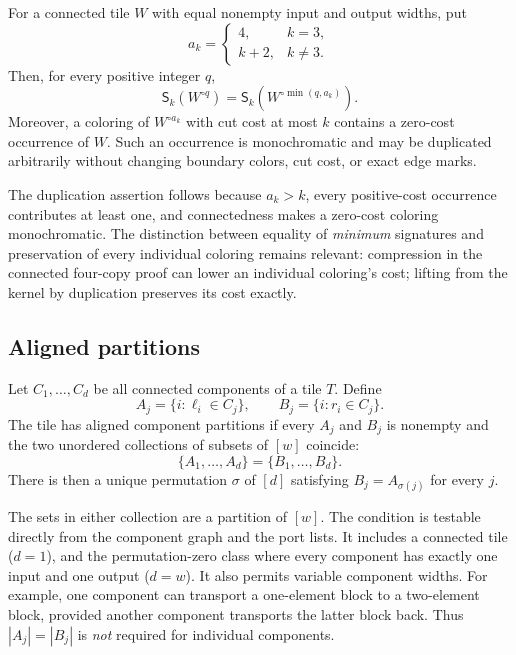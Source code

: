 \begin{lemma}
\label{lem:route-connected}
For a connected tile $W$ with equal nonempty input and output widths, put
\[
 a_k=\begin{cases}4,&k=3,\\ k+2,&k\ne3.\end{cases}
\]
Then, for every positive integer $q$,
\[
 \mathsf S_k(W^{\circ q})
 =\mathsf S_k(W^{\circ\min(q,a_k)}).
\]
Moreover, a coloring of $W^{\circ a_k}$ with cut cost at most $k$ contains a
zero-cost occurrence of $W$.  Such an occurrence is monochromatic and may be
duplicated arbitrarily without changing boundary colors, cut cost, or exact
edge marks.
\end{lemma}

The duplication assertion follows because $a_k>k$, every positive-cost
occurrence contributes at least one, and connectedness makes a zero-cost
coloring monochromatic.  The distinction between equality of \emph{minimum}
signatures and preservation of every individual coloring remains relevant:
compression in the connected four-copy proof can lower an individual coloring's
cost; lifting from the kernel by duplication preserves its cost exactly.

\subsection{Aligned partitions}

\begin{definition}
\label{def:route-aligned}
Let $C_1,\ldots,C_d$ be all connected components of a tile $T$.  Define
\[
 A_j=\{i:\ell_i\in C_j\},\qquad B_j=\{i:r_i\in C_j\}.
\]
The tile has aligned component partitions if every $A_j$ and $B_j$ is nonempty
and the two unordered collections of subsets of $[w]$ coincide:
\[
 \{A_1,\ldots,A_d\}=\{B_1,\ldots,B_d\}.
\]
There is then a unique permutation $\sigma$ of $[d]$ satisfying
$B_j=A_{\sigma(j)}$ for every $j$.
\end{definition}

The sets in either collection are a partition of $[w]$.  The condition is
testable directly from the component graph and the port lists.  It includes a
connected tile ($d=1$), and the permutation-zero class where every component
has exactly one input and one output ($d=w$).  It also permits variable component
widths.  For example, one component can transport a one-element block to a
two-element block, provided another component transports the latter block back.
Thus $|A_j|=|B_j|$ is \emph{not} required for individual components.

